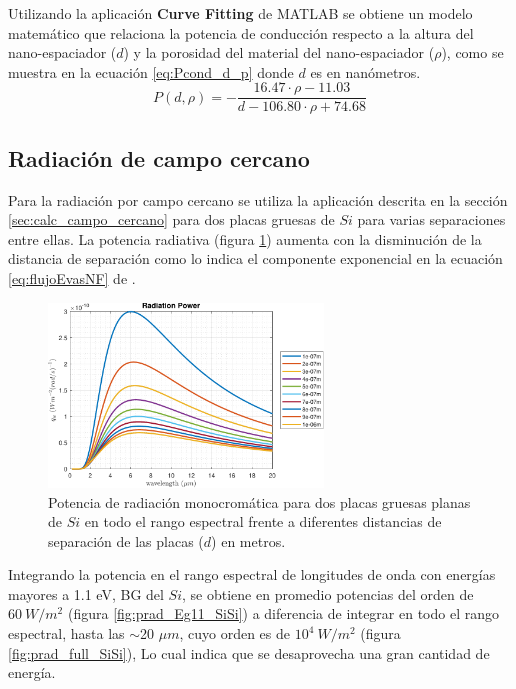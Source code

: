 Utilizando la aplicación \textbf{Curve Fitting} de MATLAB se obtiene un modelo matemático que relaciona la potencia de conducción respecto a la altura del nano-espaciador ($d$) y la porosidad del material del nano-espaciador ($\rho$), como se muestra en la ecuación \eqref{eq:Pcond_d_p} donde $d$ es en nanómetros.
\begin{equation}
P(d,\rho)=- \frac{  16.47\cdot \rho-11.03 }{d-106.80\cdot \rho +74.68}
\label{eq:Pcond_d_p}
\end{equation}\vspace{2cm}
\subsection{Radiación de campo cercano}
Para la radiación por campo cercano se utiliza la aplicación descrita en la sección \ref{sec:calc_campo_cercano} para dos placas gruesas de $Si$ para varias separaciones entre ellas. La potencia radiativa (figura \ref{fig:rad_SiSi_ds}) aumenta con la disminución de la distancia de separación como lo indica el componente exponencial en la ecuación \eqref{eq:flujoEvasNF} de \cite{nfTPV_equations}.
\begin{figure}[H]
	\centering
		\includegraphics[width=0.65\textwidth]{figuras/Resultados/radiacion/SiSi_ds.pdf}
	\caption{Potencia de radiación monocromática para dos placas gruesas planas de $Si$ en todo el rango espectral frente a diferentes distancias de separación de las placas ($d$) en metros.}
	\label{fig:rad_SiSi_ds}
\end{figure}
Integrando la potencia en el rango espectral de longitudes de onda con energías mayores a 1.1 eV, BG del $Si$, se obtiene en promedio potencias del orden de $60 \ W/m^2$ (figura \ref{fig:prad_Eg11_SiSi}) a diferencia de integrar en todo el rango espectral, hasta las $\sim$20 $\mu m$, cuyo orden es de $10^4 \ W/m^2$ (figura \ref{fig:prad_full_SiSi}), Lo cual indica que se desaprovecha una gran cantidad de energía.
